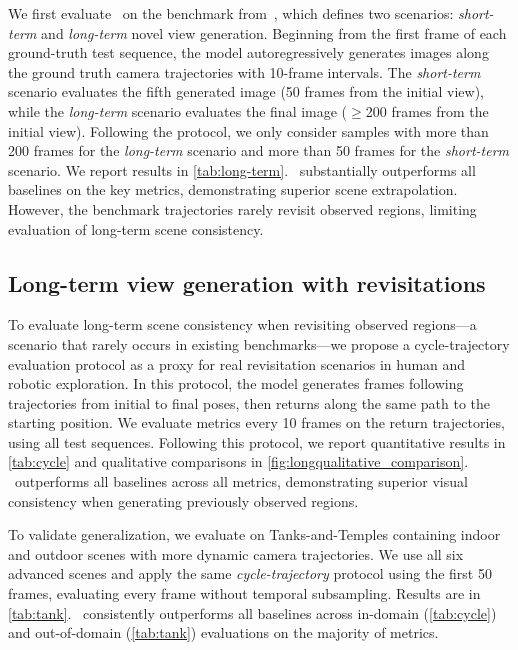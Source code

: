 We first evaluate \mname~on the benchmark from~\cite{ren2022look, photometricnvs}, which defines two scenarios: \emph{short-term} and \emph{long-term} novel view generation.
Beginning from the first frame of each ground-truth test sequence, the model autoregressively generates images along the ground truth camera trajectories with 10-frame intervals.
The \emph{short-term} scenario evaluates the fifth generated image (50 frames from the initial view), while the \emph{long-term} scenario evaluates the final image ($\geq$200 frames from the initial view).
Following the protocol, we only consider samples with more than 200 frames for the \emph{long-term} scenario and more than 50 frames for the \emph{short-term} scenario.
We report results in \cref{tab:long-term}.
\mname~substantially outperforms all baselines on the key metrics, demonstrating superior scene extrapolation.
However, the benchmark trajectories rarely revisit observed regions, limiting evaluation of long-term scene consistency.



\subsection{Long-term view generation with revisitations}%
\label{exp:cycle}

To evaluate long-term scene consistency when revisiting observed regions—a scenario that rarely occurs in existing benchmarks—we propose a cycle-trajectory evaluation protocol as a proxy for real revisitation scenarios in human and robotic exploration.
In this protocol, the model generates frames following trajectories from initial to final poses, then returns along the same path to the starting position.
We evaluate metrics every 10 frames on the return trajectories, using all test sequences.
Following this protocol, we report quantitative results in \cref{tab:cycle} and qualitative comparisons in \cref{fig:longqualitative_comparison}.
\mname~outperforms all baselines across all metrics, demonstrating superior visual consistency when generating previously observed regions.

To validate generalization, we evaluate on Tanks-and-Temples containing indoor and outdoor scenes with more dynamic camera trajectories.
We use all six advanced scenes and apply the same \emph{cycle-trajectory} protocol using the first 50 frames, evaluating every frame without temporal subsampling.
Results are in \cref{tab:tank}.
\mname~consistently outperforms all baselines across in-domain (\cref{tab:cycle}) and out-of-domain (\cref{tab:tank}) evaluations on the majority of metrics.

